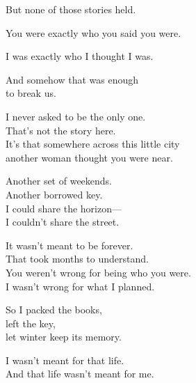 \begin{lyrics}
But none of those stories held.

You were exactly who you said you were.

I was exactly who I thought I was.

And somehow that was enough\\
to break us.


I never asked to be the only one.\\
That's not the story here.\\
It's that somewhere across this little city\\
another woman thought you were near.

Another set of weekends.\\
Another borrowed key.\\
I could share the horizon—\\
I couldn't share the street.


It wasn't meant to be forever.\\
That took months to understand.\\
You weren't wrong for being who you were.\\
I wasn't wrong for what I planned.

So I packed the books,\\
left the key,\\
let winter keep its memory.

I wasn't meant for that life.\\
And that life wasn't meant for me.
\end{lyrics}